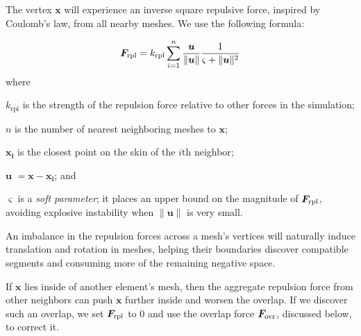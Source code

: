 The vertex $\bm{x}$ will
experience an inverse square repulsive force, inspired by Coulomb's law,
from all nearby meshes.  We use the following formula:

\begin{equation}
\bm{F}_\mathrm{rpl} = k_\mathrm{rpl} \sum_{i = 1}^{n} \frac{\bm{u}}{\| \bm{u} \| }\frac{1}{\varsigma  +\| \bm{u} \|^2 }
\end{equation}
where 
\begin{packeddescriptions}
	\item[$k_\mathrm{rpl}$]        is the strength of the repulsion force relative to
						other forces in the simulation;
	\item[$n$]        is the number of nearest neighboring meshes to $\bm{x}$; 
	\item[$\bm{x_{i}}$] is the closest point on the skin of the $i$th neighbor;
	\item[$\bm{u}$]  $= \bm{x} - \bm{x_{i}}$; and
	
	
	\item[$\varsigma$]   is a \textit{soft parameter}; it places an upper 
						bound on the magnitude of $\bm{F}_\mathrm{rpl}$, avoiding
						explosive instability when $\| \bm{u} \|$ is very small.
\end{packeddescriptions}

An imbalance in the repulsion forces across a mesh's vertices will
naturally induce translation and rotation in meshes, helping their
boundaries discover compatible segments and consuming more of the
remaining negative space.

If $\bm{x}$ lies inside of another element's mesh, then the aggregate repulsion
force from other neighbors can push $\bm{x}$ further inside and
worsen the overlap.  If we discover such an overlap, we set
$\bm{F}_\mathrm{rpl}$ to $0$ and use the overlap force $\bm{F}_\mathrm{ovr}$, discussed below, to
correct it.

\bigskip

